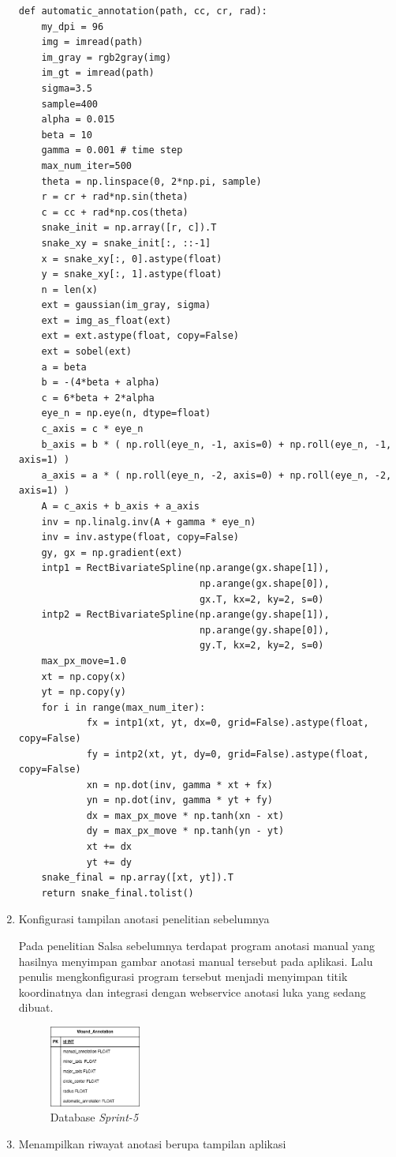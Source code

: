 \begin{enumerate}
\begin{lstlisting}
def automatic_annotation(path, cc, cr, rad):
    my_dpi = 96
    img = imread(path)
    im_gray = rgb2gray(img)
    im_gt = imread(path)
    sigma=3.5
    sample=400
    alpha = 0.015
    beta = 10
    gamma = 0.001 # time step
    max_num_iter=500
    theta = np.linspace(0, 2*np.pi, sample)
    r = cr + rad*np.sin(theta)
    c = cc + rad*np.cos(theta)
    snake_init = np.array([r, c]).T
    snake_xy = snake_init[:, ::-1]
    x = snake_xy[:, 0].astype(float)
    y = snake_xy[:, 1].astype(float)
    n = len(x)
    ext = gaussian(im_gray, sigma)
    ext = img_as_float(ext)
    ext = ext.astype(float, copy=False)
    ext = sobel(ext)
    a = beta
    b = -(4*beta + alpha)
    c = 6*beta + 2*alpha
    eye_n = np.eye(n, dtype=float)
    c_axis = c * eye_n
    b_axis = b * ( np.roll(eye_n, -1, axis=0) + np.roll(eye_n, -1, axis=1) )
    a_axis = a * ( np.roll(eye_n, -2, axis=0) + np.roll(eye_n, -2, axis=1) )
    A = c_axis + b_axis + a_axis
    inv = np.linalg.inv(A + gamma * eye_n)
    inv = inv.astype(float, copy=False)
    gy, gx = np.gradient(ext)
    intp1 = RectBivariateSpline(np.arange(gx.shape[1]),
                                np.arange(gx.shape[0]),
                                gx.T, kx=2, ky=2, s=0)
    intp2 = RectBivariateSpline(np.arange(gy.shape[1]),
                                np.arange(gy.shape[0]),
                                gy.T, kx=2, ky=2, s=0)
    max_px_move=1.0
    xt = np.copy(x)
    yt = np.copy(y)
    for i in range(max_num_iter):
            fx = intp1(xt, yt, dx=0, grid=False).astype(float, copy=False)
            fy = intp2(xt, yt, dy=0, grid=False).astype(float, copy=False)
            xn = np.dot(inv, gamma * xt + fx)
            yn = np.dot(inv, gamma * yt + fy)
            dx = max_px_move * np.tanh(xn - xt)
            dy = max_px_move * np.tanh(yn - yt)
            xt += dx
            yt += dy
    snake_final = np.array([xt, yt]).T
    return snake_final.tolist()
\end{lstlisting}

\item Konfigurasi tampilan anotasi penelitian sebelumnya
	
Pada penelitian Salsa sebelumnya terdapat program anotasi manual yang hasilnya menyimpan gambar anotasi manual tersebut pada aplikasi. Lalu penulis mengkonfigurasi program tersebut menjadi menyimpan titik koordinatnya dan integrasi dengan webservice anotasi luka yang sedang dibuat.
	\begin{figure}[H]
		\centering
		\includegraphics[keepaspectratio, width=3cm]{gambar/database_sprint_5}
		\caption{Database \textit{Sprint-5}}
		\label{gambar:database_sprint_5}
	\end{figure}
\item Menampilkan riwayat anotasi berupa tampilan aplikasi


\end{enumerate}
